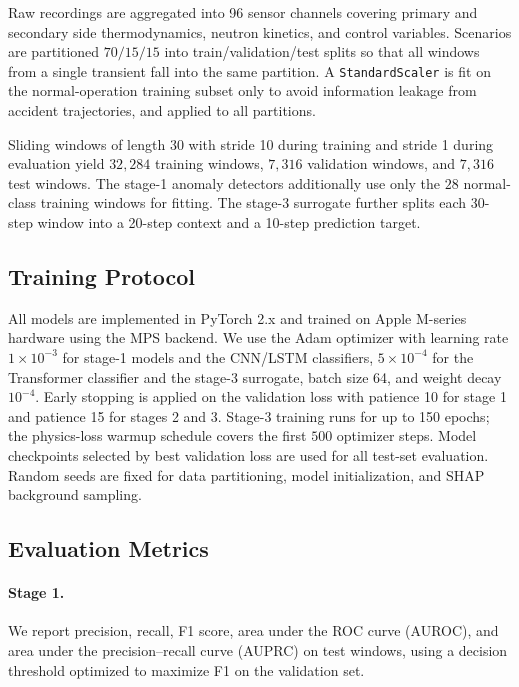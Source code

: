 Raw recordings are aggregated into 96 sensor channels covering primary and secondary side thermodynamics, neutron kinetics, and control variables. Scenarios are partitioned $70/15/15$ into train/validation/test splits so that all windows from a single transient fall into the same partition. A \texttt{StandardScaler} is fit on the normal-operation training subset only to avoid information leakage from accident trajectories, and applied to all partitions.

Sliding windows of length 30 with stride 10 during training and stride 1 during evaluation yield $32{,}284$ training windows, $7{,}316$ validation windows, and $7{,}316$ test windows. The stage-1 anomaly detectors additionally use only the $28$ normal-class training windows for fitting. The stage-3 surrogate further splits each 30-step window into a 20-step context and a 10-step prediction target.

\subsection{Training Protocol}

All models are implemented in PyTorch 2.x and trained on Apple M-series hardware using the MPS backend. We use the Adam optimizer with learning rate $1 \times 10^{-3}$ for stage-1 models and the CNN/LSTM classifiers, $5 \times 10^{-4}$ for the Transformer classifier and the stage-3 surrogate, batch size 64, and weight decay $10^{-4}$. Early stopping is applied on the validation loss with patience 10 for stage 1 and patience 15 for stages 2 and 3. Stage-3 training runs for up to 150 epochs; the physics-loss warmup schedule covers the first $500$ optimizer steps. Model checkpoints selected by best validation loss are used for all test-set evaluation. Random seeds are fixed for data partitioning, model initialization, and SHAP background sampling.

\subsection{Evaluation Metrics}

\paragraph{Stage 1.} We report precision, recall, F1 score, area under the ROC curve (AUROC), and area under the precision--recall curve (AUPRC) on test windows, using a decision threshold optimized to maximize F1 on the validation set.

